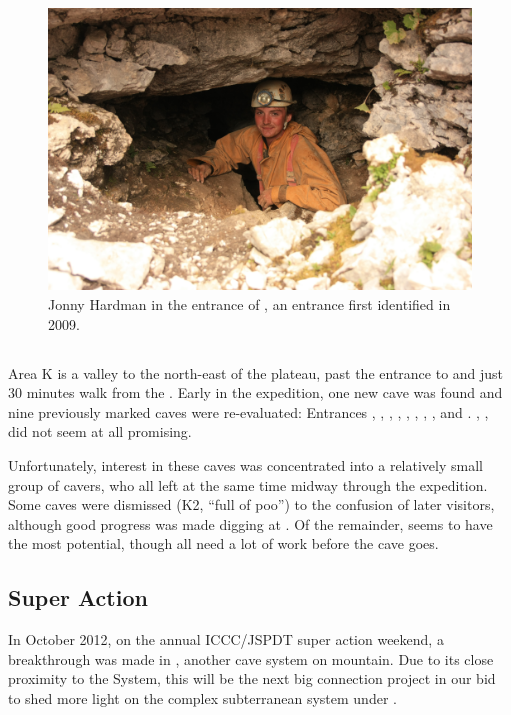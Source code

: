 \begin{figure}
\checkoddpage \ifoddpage \forcerectofloat \else \forceversofloat \fi
   \centering
\includegraphics[width = \textwidth]{2012/discoveries/2012-08-10-0620-GergelyAmbrus-IMG_2275--N9--orig.jpg}
\caption{Jonny Hardman in the entrance of , an entrance first identified in 2009. } \label{N9 entrance}
\end{figure}

\subsection{}

Area K is a valley to the north-east of the plateau, past the entrance to  and just 30 minutes walk from the . Early in the expedition, one new cave was found and nine previously marked caves were re-evaluated: Entrances , , , , , , , , and . , ,  did not seem at all promising. 

Unfortunately, interest in these caves was concentrated into a relatively small group of cavers, who all left at the same time midway through the expedition. Some caves were dismissed (K2, “full of poo”) to the confusion of later visitors, although good progress was made digging at . Of the remainder,  seems to have the most potential, though all need a lot of work before the cave goes.


\subsection{Super Action}

In October 2012, on the annual ICCC/JSPDT super action weekend, a
breakthrough was made in , another cave system on
mountain. Due to its close proximity to the System, this will be the
next big connection project in our bid to shed more light on the complex
subterranean system under .